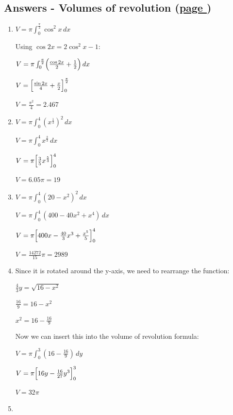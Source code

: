 \documentclass[../main.tex]{subfiles}
\begin{document}
\hypertarget{volumesofrevolutionanswers}{\subsection*{Answers - Volumes of revolution (\hyperlink{volumesofrevolutionlink}{page \pageref{Volumes of revolution}})}}

\label{Volumes of revolution answers}
\begin{spacing}{1.5}

\begin{enumerate}[itemsep=0.7cm]
    \item 
    $V=\pi \int_0^{\frac{\pi}{2}} \cos^2{x}\,dx$

    Using $\cos{2x}=2\cos^2{x}-1$:

    $V=\pi \int_0^{\frac{\pi}{2}} \Bigl(\frac{\cos{2x}}{2}+\frac{1}{2}\Bigr)\, dx$

    $V=\Bigl[\frac{\sin{2x}}{4}+\frac{x}{2}\Bigr]_0^{\frac{\pi}{2}}$

    $V=\frac{\pi^2}{4}=2.467$

    \item 
    $V=\pi \int_0^4 (x^{\frac{1}{3}})^2\,dx$

    $V=\pi \int_0^4 x^{\frac{2}{3}}\, dx$

    $V=\pi \Bigl[\frac{3}{5}x^{\frac{5}{3}} \Bigr]_0^4$

    $V=6.05\pi = 19$

    \item
    $V=\pi \int_0^4 (20-x^2)^2\, dx$

    $V=\pi \int_0^4 (400-40x^2+x^4)\,dx$

    $V=\pi \Bigl[400x-\frac{40}{3}x^3+\frac{x^5}{5} \Bigr]_0^4$

    $V=\frac{14272}{15}\pi=2989$

    \item 
    Since it is rotated around the y-axis, we need to rearrange the function:

    $\frac{4}{3}y=\sqrt{16-x^2}$

    $\frac{16}{9}=16-x^2$

    $x^2=16-\frac{16}{9}$

    Now we can insert this into the volume of revolution formula:

    $V=\pi \int_0^3 (16-\frac{16}{9})\,dy$

    $V=\pi \Bigl[16y-\frac{16}{27}y^3\Bigr]_0^3$

    $V=32\pi$

    \item 
    

\end{enumerate}
\end{spacing}
\end{document}
